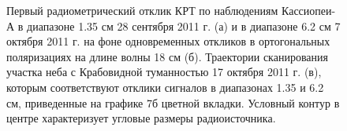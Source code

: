 \begin{figure}
 \caption{Первый радиометрический отклик КРТ по наблюдениям Кассиопеи-А
в диапазоне 1.35 см 28 сентября 2011 г. (а)
и в диапазоне 6.2 см 7 октября 2011 г.
на фоне одновременных откликов в ортогональных поляризациях
на длине волны 18 см  (б).
Траектории сканирования участка неба с Крабовидной туманностью
17 октября 2011 г. (в), которым соответствуют отклики
сигналов в диапазонах 1.35 и 6.2 см, приведенные на графике 7б цветной вкладки.
Условный контур в центре характеризует угловые размеры
радиоисточника.}
\end{figure}

